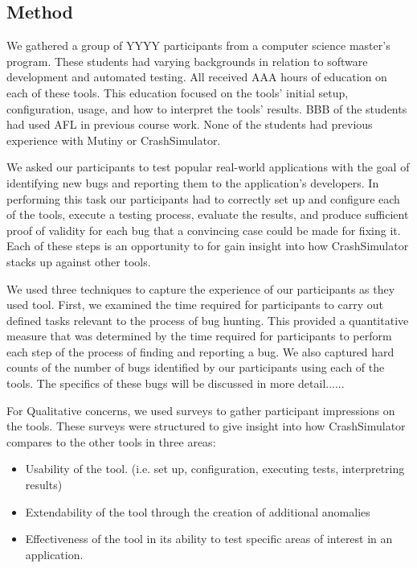 \subsection{Method}

We gathered a group of YYYY participants from a computer science master's
program.  These students had varying backgrounds in relation to software
development and automated testing.  All received AAA hours
of education on each of these tools.  This education focused on the tools'
initial setup, configuration, usage, and how to interpret the tools'
results.  BBB of the students had used AFL in previous course work.  None
of the students had previous experience with Mutiny or CrashSimulator.

We asked our participants
to test popular real-world applications with the goal of identifying
new bugs and reporting them to the application's developers.  In performing
this task our participants had to correctly set up and configure each of
the tools, execute a testing process, evaluate the results, and produce
sufficient proof of validity for each bug that a convincing case
could be made for fixing
it.  Each of these steps is an opportunity to for gain insight
into how CrashSimulator stacks up against other tools.

We used three techniques to capture the
experience of our participants as they
used tool.  First, we examined the time required for participants to carry
out defined tasks relevant to the process of bug hunting. This provided a
quantitative measure that was determined by the time
required for participants to
perform each step of the process of finding and reporting a
bug.
We also captured hard counts of the number of bugs identified by our
participants using each of the tools.
The specifics of these bugs will be discussed in more
detail......

For Qualitative concerns, we used surveys to gather participant impressions
on the tools.
These surveys were structured to give insight into how
CrashSimulator compares to the other tools in three areas:

\begin{itemize}

\item Usability of the tool. (i.e. set up, configuration, executing tests,
interpretring results)

\item Extendability of the tool through the creation of additional
anomalies

\item Effectiveness of the tool in its ability to test specific areas of
interest in an application.

\end{itemize}

